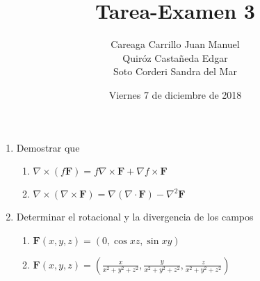 \documentclass{article}
\begin{document}
    \title{Tarea-Examen 3}
    \author{Careaga Carrillo Juan Manuel\\
            Quiróz Castañeda Edgar\\
            Soto Corderi Sandra del Mar}
    \date{Viernes 7 de diciembre de 2018}
    \maketitle
    \begin{enumerate}

        \item {
            Demostrar que
            
            \begin{enumerate}
            \item{
				$\nabla \times (f \mathbf{F}) = f \nabla \times \mathbf{F} + \nabla f \times \mathbf{F}$
				
			\color{azul}
           

            }
            
            \item{
            	$\nabla \times (\nabla \times \mathbf{F}) = \nabla (\nabla \cdot \mathbf{F}) - \nabla^2 \mathbf{F}$
           
           \color{azul}
            
            }
            \end{enumerate}                        
	    }

        \item {
            Determinar el rotacional y la divergencia de los campos
            
            \begin{enumerate}
            \item{
				$\mathbf{F} (x,y,z) = (0,\cos xz,\sin xy)$
				
			\color{azul}
            }
            
            \item{
            	$\mathbf{F} (x,y,z) = (\frac{x}{x^2 + y^2 + z^2}, \frac{y}{x^2 + y^2 + z^2}, \frac{z}{x^2 + y^2 + z^2})$
           
           \color{azul}
            
            }
            \end{enumerate}            
        }


\end{enumerate}
\end{document}
